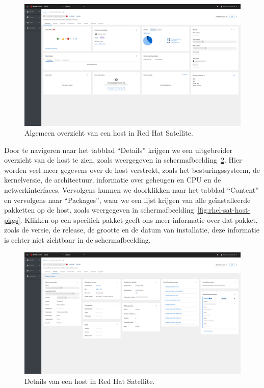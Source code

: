 \begin{figure}[h!]
    \includegraphics[width=\textwidth]
    {./graphics/state-of-the-art/rhel-satellite/rhel-sat-host-overview.png}
    \caption{\label{fig:rhel-sat-host-overview}Algemeen overzicht van een host in Red Hat Satellite.}
\end{figure}

Door te navigeren naar het tabblad ``Details'' krijgen we een uitgebreider overzicht van de host te zien, zoals weergegeven in schermafbeelding~\ref{fig:rhel-sat-host-details}.
Hier worden veel meer gegevens over de host verstrekt, zoals het besturingssysteem, de kernelversie, de architectuur, informatie over geheugen en CPU en de netwerkinterfaces.
Vervolgens kunnen we doorklikken naar het tabblad ``Content'' en vervolgens naar ``Packages'', waar we een lijst krijgen van alle ge\"installeerde pakketten op de host, zoals weergegeven in schermafbeelding~\ref{fig:rhel-sat-host-pkgs}.
Klikken op een specifiek pakket geeft ons meer informatie over dat pakket, zoals de versie, de release, de grootte en de datum van installatie, deze informatie is echter niet zichtbaar in de schermafbeelding.

\begin{figure}[h!]
    \includegraphics[width=\textwidth]
    {./graphics/state-of-the-art/rhel-satellite/rhel-sat-host-details.png}
    \caption{\label{fig:rhel-sat-host-details}Details van een host in Red Hat Satellite.}
\end{figure}

